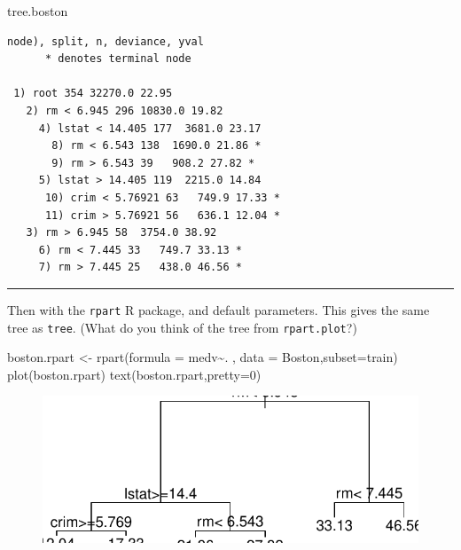 \documentclass[
  letterpaper,
  DIV=11,
  numbers=noendperiod]{scrartcl}
\newenvironment{Shaded}{\begin{snugshade}}{\end{snugshade}}
\newcommand{\AttributeTok}[1]{\textcolor[rgb]{0.40,0.45,0.13}{#1}}
\newcommand{\DecValTok}[1]{\textcolor[rgb]{0.68,0.00,0.00}{#1}}
\newcommand{\FunctionTok}[1]{\textcolor[rgb]{0.28,0.35,0.67}{#1}}
\newcommand{\NormalTok}[1]{\textcolor[rgb]{0.00,0.23,0.31}{#1}}
\newcommand{\OtherTok}[1]{\textcolor[rgb]{0.00,0.23,0.31}{#1}}
\newcommand{\SpecialCharTok}[1]{\textcolor[rgb]{0.37,0.37,0.37}{#1}}
\begin{document}
\begin{Shaded}
\begin{Highlighting}[]
\NormalTok{tree.boston}
\end{Highlighting}
\end{Shaded}

\begin{verbatim}
node), split, n, deviance, yval
      * denotes terminal node

 1) root 354 32270.0 22.95  
   2) rm < 6.945 296 10830.0 19.82  
     4) lstat < 14.405 177  3681.0 23.17  
       8) rm < 6.543 138  1690.0 21.86 *
       9) rm > 6.543 39   908.2 27.82 *
     5) lstat > 14.405 119  2215.0 14.84  
      10) crim < 5.76921 63   749.9 17.33 *
      11) crim > 5.76921 56   636.1 12.04 *
   3) rm > 6.945 58  3754.0 38.92  
     6) rm < 7.445 33   749.7 33.13 *
     7) rm > 7.445 25   438.0 46.56 *
\end{verbatim}

\begin{center}\rule{0.5\linewidth}{0.5pt}\end{center}

Then with the \texttt{rpart} R package, and default parameters. This
gives the same tree as \texttt{tree}. (What do you think of the tree
from \texttt{rpart.plot}?)

\begin{Shaded}
\begin{Highlighting}[]
\NormalTok{boston.rpart }\OtherTok{\textless{}{-}} \FunctionTok{rpart}\NormalTok{(}\AttributeTok{formula =}\NormalTok{ medv}\SpecialCharTok{\textasciitilde{}}\NormalTok{. , }\AttributeTok{data =}\NormalTok{ Boston,}\AttributeTok{subset=}\NormalTok{train)}
\FunctionTok{plot}\NormalTok{(boston.rpart)}
\FunctionTok{text}\NormalTok{(boston.rpart,}\AttributeTok{pretty=}\DecValTok{0}\NormalTok{)}
\end{Highlighting}
\end{Shaded}

\begin{figure}[H]

{\centering \includegraphics{L13_files/figure-pdf/unnamed-chunk-7-1.pdf}

}

\end{figure}
\end{document}

